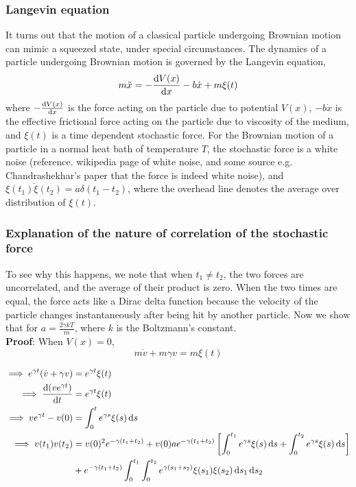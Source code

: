 \documentclass[12pt, twoside]{article}
\begin{document}
\subsubsection{Langevin equation}
It turns out that the motion of a classical particle undergoing Brownian motion can mimic a squeezed state, under special circumstances. The dynamics of a particle undergoing Brownian motion is governed by the Langevin equation,\begin{equation}\label{eq:Langevin}m \ddot{x} = -\derivative{V(x)}{x} - b \dot{x} + m \xi(t)\end{equation} where $-\derivative{V(x)}{x}$ is the force acting on the particle due to potential $V(x)$, $-b\dot{x}$ is the effective frictional force acting on the particle due to viscosity of the medium, and $\xi(t)$ is a time dependent stochastic force.
For the Brownian motion of a particle in a normal heat bath of temperature $T$, the stochastic force is a white noise (reference. wikipedia page of white noise, and some source e.g. Chandrashekhar's paper that the force is indeed white noise), and $\overline{\xi(t_1)\xi(t_2)} = a \delta(t_1 - t_2)$, where the overhead line denotes the average over distribution of $\xi(t)$.
\subsubsection{Explanation of the nature of correlation of the stochastic force}\label{fluctuation_dissipation_proof} To see why this happens, we note that when $t_1 \neq t_2$, the two forces are uncorrelated, and the average of their product is zero. When the two times are equal, the force acts like a Dirac delta function because the velocity of the particle changes instantaneously after being hit by another particle. Now we show that for $a = \frac{2 \gamma k T}{m}$, where $k$ is the Boltzmann's constant.\\
\textbf{Proof}: When $V(x) = 0$,\begin{equation}\label{eq:lang_no_pot}
	m\dot{v}+m\gamma v = m \xi(t)
\end{equation} 

$\begin{aligned}\implies e^{\gamma t}(\dot{v}+\gamma v) &= e^{\gamma t} \xi(t) \\ \implies \derivative{(ve^{\gamma t})}{t} &= e^{\gamma t} \xi(t)\\ \implies ve^{\gamma t} - v(0) &= \int_{0}^{t} e^{\gamma s} \xi(s) \dd{s} \\ \implies v(t_1) v(t_2) &= v(0)^2 e^{-\gamma(t_1 + t_2)} + v(0) a e^{-\gamma(t_1 + t_2)} \left[\int_{0}^{t_1} e^{\gamma s} \xi(s) \dd{s} + \int_{0}^{t_2} e^{\gamma s} \xi(s) \dd{s}\right] \\&+ e^{-\gamma(t_1 + t_2)} \int_{0}^{t_1}\int_{0}^{t_2} e^{\gamma(s_1 + s_2)} \xi(s_1)\xi(s_2) \dd{s_1} \dd{s_2} \end{aligned}$
\end{document}
